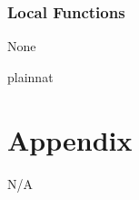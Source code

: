 \documentclass[12pt, titlepage]{article}
\begin{document}

\subsubsection{Local Functions} None



\newpage

 {plainnat}


\newpage

\section{Appendix} \label{Appendix}
N/A
\end{document}
